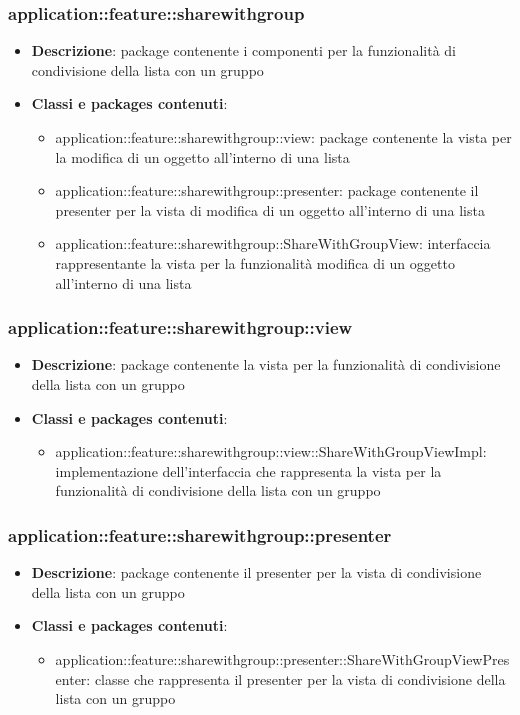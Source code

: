 \subsubsection{application::feature::sharewithgroup}
\begin{itemize}
	\item \textbf{Descrizione}: package contenente i componenti per la funzionalità di condivisione della lista con un gruppo
	\item \textbf{Classi e packages contenuti}:
	\begin{itemize}
	\item application::feature::sharewithgroup::view: package contenente la vista per la modifica di un oggetto all'interno di una lista
	\item application::feature::sharewithgroup::presenter: package contenente il presenter per la vista di modifica di un oggetto all'interno di una lista
	\item application::feature::sharewithgroup::ShareWithGroupView: interfaccia rappresentante la vista per la funzionalità modifica di un oggetto all'interno di una lista
	\end{itemize}
\end{itemize}

\subsubsection{application::feature::sharewithgroup::view}
\begin{itemize}
	\item \textbf{Descrizione}: package contenente la vista per la funzionalità di condivisione della lista con un gruppo
	\item \textbf{Classi e packages contenuti}:
	\begin{itemize}
	\item application::feature::sharewithgroup::view::ShareWithGroupViewImpl: implementazione dell'interfaccia che rappresenta la vista per la funzionalità di condivisione della lista con un gruppo
	\end{itemize}
\end{itemize}

\subsubsection{application::feature::sharewithgroup::presenter}
\begin{itemize}
	\item \textbf{Descrizione}: package contenente il presenter per la vista di condivisione della lista con un gruppo
	\item \textbf{Classi e packages contenuti}:
	\begin{itemize}
	\item application::feature::sharewithgroup::presenter::ShareWithGroupViewPresenter: classe che rappresenta il presenter per la vista di condivisione della lista con un gruppo
	\end{itemize}
\end{itemize}


